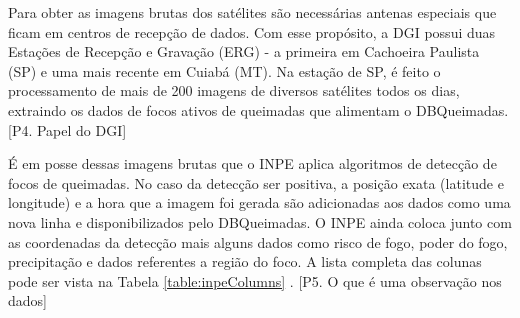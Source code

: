 \documentclass[cic,tc]{iiufrgs}
\begin{document}
Para obter as imagens brutas dos satélites são necessárias antenas especiais que ficam em centros de recepção de dados. Com esse propósito, a DGI possui duas Estações de Recepção e Gravação (ERG) - a primeira em Cachoeira Paulista (SP) e uma mais recente em Cuiabá (MT). Na estação de SP, é feito o processamento de mais de 200 imagens de diversos satélites todos os dias, extraindo os dados de focos ativos de queimadas que alimentam o DBQueimadas. \citep{SiteDGI} [P4. Papel do DGI] \par

É em posse dessas imagens brutas que o INPE aplica algoritmos de detecção de focos de queimadas. No caso da detecção ser positiva, a posição exata (latitude e longitude) e a hora que a imagem foi gerada são adicionadas aos dados como uma nova linha e disponibilizados pelo DBQueimadas. O INPE ainda coloca junto com as coordenadas da detecção mais alguns dados como risco de fogo, poder do fogo, precipitação e dados referentes a região do foco. A lista completa das colunas pode ser vista na Tabela \ref{table:inpeColumns} \cite{PerguntasFrequentesINPE}. [P5. O que é uma observação nos dados] \par
\end{document}
